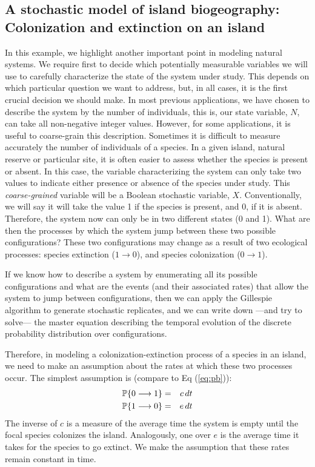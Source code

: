 \subsection{A stochastic model of island biogeography: \\
Colonization and extinction on an island}
In this example, we highlight another important point in modeling natural systems. We require first to decide which potentially measurable variables we will use to carefully characterize the state of the system under study. This depends on which particular question we want to address, but, in all cases, it is the first crucial decision we should make. In most previous applications, we have chosen to describe the system by the number of individuals, this is, our state variable, $N$, can take all non-negative integer values. However, for some applications, it is useful to coarse-grain this description. Sometimes it is difficult to measure accurately the number of individuals of a species. In a given island, natural reserve or particular site, it is often easier to assess whether the species is present or absent. In this case, the variable characterizing the system can only take two values to indicate either presence or absence of the species under study. This {\it coarse-grained} variable will be a Boolean stochastic variable, $X$. Conventionally, we will say it will take the value 1 if the species is present, and 0, if it is absent. Therefore, the system now can only be in two different states (0 and 1). What are then the processes by which the system jump between these two possible configurations?  These two configurations may change as a result of two ecological processes: species extinction ($1 \rightarrow 0$), and species colonization ($0 \rightarrow 1$). 
\smallskip

If we know how to describe a system by enumerating all its possible configurations and what are the events (and their associated rates) that allow the system to jump between configurations, then we can apply the Gillespie algorithm to generate stochastic replicates, and we can write down ---and try to solve--- the master equation describing the temporal evolution of the discrete probability distribution over configurations.
\smallskip

Therefore, in modeling a colonization-extinction process of a species in an island, we need to make an assumption about the rates at which these two processes occur. The simplest assumption is (compare to Eq (\ref{eq:pb})):
\begin{eqnarray}
{\mathbb P}\{ 0 \longrightarrow 1 \} & = & c\,dt \nonumber\\
{\mathbb P}\{ 1 \longrightarrow 0 \} & = & e\,dt
\label{eq:c-e}
\end{eqnarray}
The inverse of $c$ is a measure of the average time the system is empty until the focal species colonizes the island. Analogously, one over $e$ is the average time it takes for the species to go extinct. We make the assumption that these rates remain constant in time. 
\smallskip

